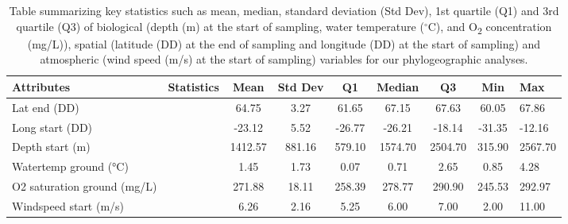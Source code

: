 \begin{table}[ht]
\centering
\begin{tabular}{|l|l|c|c|c|c|c|c|}
\hline
\textbf{Attributes} & \textbf{Statistics} & \textbf{Mean} & \textbf{Std Dev} & \textbf{Q1} & \textbf{Median} & \textbf{Q3} & \textbf{Min} & \textbf{Max} \\ \hline
Lat end (DD)        &                     & 64.75         & 3.27             & 61.65       & 67.15           & 67.63       & 60.05        & 67.86        \\ \hline
Long start (DD)     &                     & -23.12        & 5.52             & -26.77      & -26.21          & -18.14      & -31.35       & -12.16       \\ \hline
Depth start (m)     &                     & 1412.57       & 881.16           & 579.10      & 1574.70         & 2504.70     & 315.90       & 2567.70      \\ \hline
Watertemp ground (°C) &                   & 1.45          & 1.73             & 0.07        & 0.71            & 2.65        & 0.85         & 4.28         \\ \hline
O2 saturation ground (mg/L) &             & 271.88        & 18.11            & 258.39      & 278.77          & 290.90      & 245.53       & 292.97       \\ \hline
Windspeed start (m/s) &                    & 6.26          & 2.16             & 5.25        & 6.00            & 7.00        & 2.00         & 11.00        \\ \hline
\end{tabular}
\caption{Table summarizing key statistics such as mean, median, standard deviation (Std Dev), 1st quartile (Q1) and 3rd quartile (Q3) of biological (depth (m) at the start of sampling, water temperature ($^\circ$C), and O\textsubscript{2} concentration (mg/L)), spatial (latitude (DD) at the end of sampling and longitude (DD) at the start of sampling) and atmospheric (wind speed (m/s) at the start of sampling) variables for our phylogeographic analyses. \label{fig:tab1}}
\end{table}

